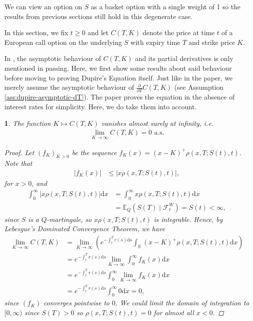 \documentclass[english]{article}
\numberwithin{equation}{section}
\numberwithin{figure}{section}
\theoremstyle{bolddescit}
\newtheorem{theorem}{\protect\theoremname}[section]
\theoremstyle{definition}
\theoremstyle{definition}
\theoremstyle{plain}
\theoremstyle{plain}
\theoremstyle{bolddesc}
\theoremstyle{plain}
\theoremstyle{remark}
\providecommand{\theoremname}{Theorem}
\begin{document}
We can view an option on $S$ as a basket option with a single weight of 1 so the results from previous sections still hold in this degenerate case.

In this section, we fix $t \ge 0$ and let $C(T,K)$ denote the price at time $t$ of a European call option on the underlying $S$ with expiry time $T$ and strike price $K$.

In \textcite{dupire_pricing_1993}, the asymptotic behaviour of $C(T,K)$ and its partial derivatives is only mentioned in passing. Here, we first show some results about said behaviour before moving to proving Dupire's Equation itself. Just like in the paper, we merely assume the asymptotic behaviour of $\frac{\partial}{\partial T} C(T,K)$ (see Assumption \ref{ass:dupire-asymptotic-dT}). The paper proves the equation in the absence of interest rates for simplicity. Here, we do take them into account.

\begin{theorem}\label{thm:dupire-asymptotic}
  The function $K \mapsto C(T,K)$ vanishes almost surely at infinity, i.e.
  \begin{align*}
    \lim_{K \to \infty} C(T,K) = 0 \text{ a.s.}
  \end{align*}

  \begin{proof}
    Let $(f_K)_{K > 0}$ be the sequence $f_K(x) = (x-K)^+ \rho(x,T;S(t),t)$. Note that
    \begin{align*}
      |f_K(x)|
      &\le |x \rho(x,T;S(t),t)|,
    \end{align*}
    for $x > 0$, and
    \begin{align*}
      \int_0^\infty |x\rho(x,T;S(t),t)| \mathrm{d}x
      &= \int_0^\infty x\rho(x,T;S(t),t) \mathrm{d}x \tag{positive integrand}\\
      &= \mathbb{E}_Q(S(T) \mid \mathcal{F}^W_t)
      = S(t) < \infty,
    \end{align*}
    since $S$ is a $Q$-martingale, so $x \rho(x,T;S(t),t)$ is integrable. Hence, by Lebesgue's Dominated Convergence Theorem, we have
    \begin{align*}
      \lim_{K \to \infty} C(T,K)
      &= \lim_{K \to \infty} \left(e^{-\int_t^T r(s) \mathrm{d}s} \int_\mathbb{R} (x-K)^+ \rho(x,T;S(t),t) \mathrm{d}x\right) \\
      &= e^{-\int_t^T r(s) \mathrm{d}s} \lim_{K \to \infty} \int_0^\infty f_K(x) \mathrm{d}x\\
      &= e^{-\int_t^T r(s) \mathrm{d}s} \int_0^\infty \lim_{K \to \infty} f_K(x) \mathrm{d}x\\
      &= e^{-\int_t^T r(s) \mathrm{d}s} \int_0^\infty 0 \mathrm{d}x = 0,
    \end{align*}
    since $(f_K)$ converges pointwise to $0$. We could limit the domain of integration to $[0,\infty)$ since $S(T) > 0$ so $\rho(x,T;S(t),t) = 0$ for almost all $x < 0$.
  \end{proof}
\end{theorem}
\end{document}
